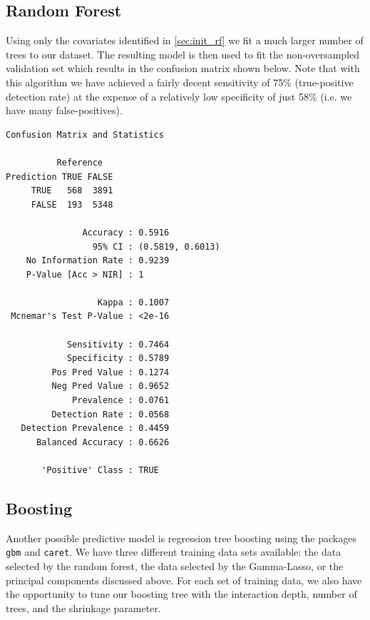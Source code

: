 \documentclass[11pt, fleqn]{article}
\begin{document}


\subsection{Random Forest}\label{sec:mod_rf}
Using only the covariates identified in \cref{sec:init_rf} we fit a much larger number of trees to our dataset.  The resulting model is then used to fit the non-oversampled validation set which results in the confusion matrix shown below.  Note that with this algorithm we have achieved a fairly decent sensitivity of 75\% (true-positive detection rate) at the expense of a relatively low specificity of just 58\% (i.e. we have many false-positives).

\begin{verbatim}
Confusion Matrix and Statistics

          Reference
Prediction TRUE FALSE
     TRUE   568  3891
     FALSE  193  5348
                                          
               Accuracy : 0.5916          
                 95% CI : (0.5819, 0.6013)
    No Information Rate : 0.9239          
    P-Value [Acc > NIR] : 1               
                                          
                  Kappa : 0.1007          
 Mcnemar's Test P-Value : <2e-16          
                                          
            Sensitivity : 0.7464          
            Specificity : 0.5789          
         Pos Pred Value : 0.1274          
         Neg Pred Value : 0.9652          
             Prevalence : 0.0761          
         Detection Rate : 0.0568          
   Detection Prevalence : 0.4459          
      Balanced Accuracy : 0.6626          
                                          
       'Positive' Class : TRUE
\end{verbatim}

\subsection{Boosting}
Another possible predictive model is regression tree boosting using the packages \texttt{gbm} and \texttt{caret}. We have three different training data sets available: the data selected by the random forest, the data selected by the Gamma-Lasso, or the principal components discussed above. For each set of training data, we also have the opportunity to tune our boosting tree with the interaction depth, number of trees, and the shrinkage parameter.
\end{document}
